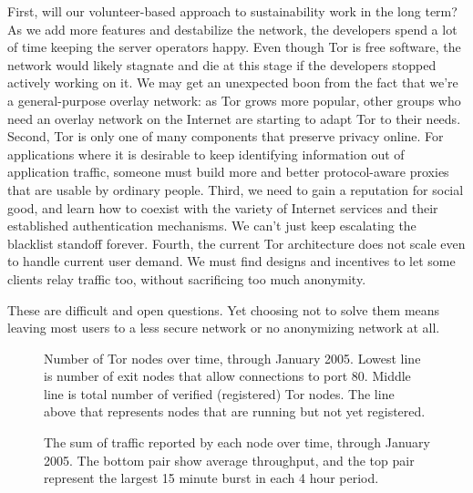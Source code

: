 \documentclass{llncs}
\begin{document}
First, will our volunteer-based approach to sustainability work in the
long term? As we add more features and destabilize the network, the
developers spend a lot of time keeping the server operators happy. Even
though Tor is free software, the network would likely stagnate and die at
this stage if the developers stopped actively working on it. We may get
an unexpected boon from the fact that we're a general-purpose overlay
network: as Tor grows more popular, other groups who need an overlay
network on the Internet are starting to adapt Tor to their needs.
%
Second, Tor is only one of many components that preserve privacy online.
For applications where it is desirable to
keep identifying information out of application traffic, someone must build
more and better protocol-aware proxies that are usable by ordinary people.
%
Third, we need to gain a reputation for social good, and learn how to
coexist with the variety of Internet services and their established
authentication mechanisms. We can't just keep escalating the blacklist
standoff forever.
%
Fourth, the current Tor
architecture does not scale even to handle current user demand. We must
find designs and incentives to let some clients relay traffic too, without
sacrificing too much anonymity.

These are difficult and open questions. Yet choosing not to solve them
means leaving most users to a less secure network or no anonymizing
network at all.

 

\clearpage
\appendix

\begin{figure}[t]
\centering
\mbox{}
\caption{Number of Tor nodes over time, through January 2005. Lowest
line is number of exit
nodes that allow connections to port 80. Middle line is total number of
verified (registered) Tor nodes. The line above that represents nodes
that are running but not yet registered.}
\label{fig:graphnodes}
\end{figure}

\begin{figure}[t]
\centering
\mbox{}
\caption{The sum of traffic reported by each node over time, through
January 2005. The bottom
pair show average throughput, and the top pair represent the largest 15
minute burst in each 4 hour period.}
\label{fig:graphtraffic}
\end{figure}
\end{document}
